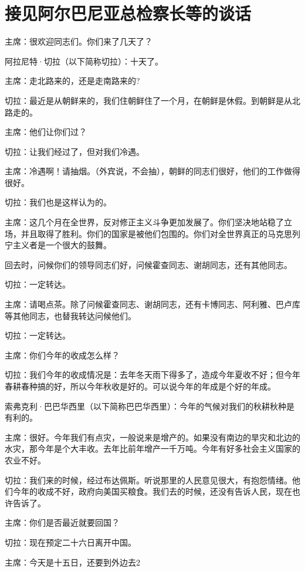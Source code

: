 \section[接见阿尔巴尼亚总检察长等的谈话（一九六三年十一月十五日）]{接见阿尔巴尼亚总检察长等的谈话}


主席：很欢迎同志们。你们来了几天了？

阿拉尼特·切拉（以下简称切拉）：十天了。

主席：走北路来的，还是走南路来的?

切拉：最近是从朝鲜来的，我们住朝鲜住了一个月，在朝鲜是休假。到朝鲜是从北路走的。

主席：他们让你们过？

切拉：让我们经过了，但对我们冷遇。

主席：冷遇啊！请抽烟。（外宾说，不会抽），朝鲜的同志们很好，他们的工作做得很好。

切拉：我们也是这样认为的。

主席：这几个月在全世界，反对修正主义斗争更加发展了。你们坚决地站稳了立场，并且取得了胜利。你们的国家是被他们包围的。你们对全世界真正的马克思列宁主义者是一个很大的鼓舞。

回去时，问候你们的领导同志们好，问候霍查同志、谢胡同志，还有其他同志。

切拉：一定转达。

主席：请喝点茶。除了问候霍查同志、谢胡同志，还有卡博同志、阿利雅、巴卢库等其他同志，也替我转达问候他们。

切拉：一定转达。

主席：你们今年的收成怎么样？

切拉：我们今年的收成情况是：去年冬天雨下得多了，造成今年夏收不好；但今年春耕春种搞的好，所以今年秋收是好的。可以说今年的年成是个好的年成。

索弗克利·巴巴华西里（以下简称巴巴华西里）：今年的气候对我们的秋耕秋种是有利的。

主席：很好。今年我们有点灾，一般说来是增产的。如果没有南边的旱灾和北边的水灾，那今年是个大丰收。去年比前年增产一千万吨。今年有好多社会主义国家的农业不好。

切拉：我们来的时候，经过布达佩斯。听说那里的人民意见很大，有抱怨情绪。他们今年的收成不好，政府向美国买粮食。我们去的时候，还没有告诉人民，现在也许告诉了。

主席：你们是否最近就要回国？

切拉：现在预定二十六日离开中国。

主席：今天是十五日，还要到外边去2

